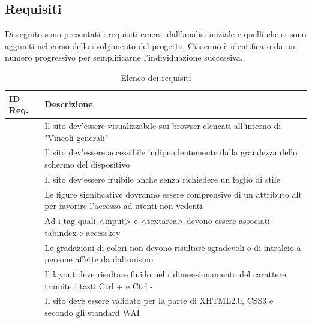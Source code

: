 \documentclass[12pt,a4paper,titlepage]{article}
\begin{document}
{	\subsection{Requisiti}{
		Di seguito sono presentati i requisiti emersi dall'analisi iniziale e quelli che si sono aggiunti nel corso dello svolgimento del progetto. Ciascuno è identificato da un numero progressivo per semplificarne l'individuazione successiva.\\
		\newcommand\rownumber{\stepcounter{magicrownumbers}\arabic{magicrownumbers}}
		\begin{table}[h]
			\centering
			\begin{tabular}{|p{}|p{}|}
				\hline
				\textbf{ID Req.} & \textbf{Descrizione}\\
				\hline
				\centering \rownumber	&	Il sito dev'essere visualizzabile sui browser elencati all'interno di "Vincoli generali"\\
				\hline
				\centering \rownumber	&	Il sito dev'essere accessibile indipendentemente dalla grandezza dello schermo del dispositivo\\
				\hline
				\centering \rownumber	&	Il sito dev'essere fruibile anche senza richiedere un foglio di stile\\
				\hline
				\centering \rownumber	&	Le figure significative dovranno essere comprensive di un attributo alt per favorire l'accesso ad utenti non vedenti\\
				\hline
				\centering \rownumber	&	Ad i tag quali <input> e <textarea> devono essere associati tabindex e accesskey\\
				\hline
				\centering \rownumber	&	Le gradazioni di colori non devono risultare sgradevoli o di intralcio a persone affette da daltonismo\\
				\hline
				\centering \rownumber	&	Il layout deve risultare fluido nel ridimensionamento del carattere tramite i tasti Ctrl + e Ctrl -\\
				\hline
				\centering \rownumber	&	Il sito deve essere validato per la parte di XHTML2.0, CSS3 e secondo gli standard WAI\\
				\hline
			\end{tabular}
			\label{tab:requisiti}
			\caption{Elenco dei requisiti}
		\end{table}
	}
}

\newpage
\end{document}
